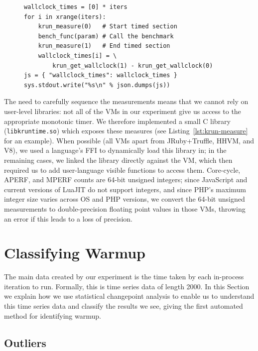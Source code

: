 \documentclass[acmlarge]{acmart}\settopmatter{printfolios=true}
\newcommand{\numiterations}{2000\xspace}
\begin{document}
\begin{figure}[t]
\begin{lstlisting}[label=lst:pyiter, caption={An elided version of the Python
in-process iteration runner (with core cycles etc. removed).}]
wallclock_times = [0] * iters
for i in xrange(iters):
    krun_measure(0)   # Start timed section
    bench_func(param) # Call the benchmark
    krun_measure(1)   # End timed section
    wallclock_times[i] = \
        krun_get_wallclock(1) - krun_get_wallclock(0)
js = { "wallclock_times": wallclock_times }
sys.stdout.write("%s\n" % json.dumps(js))
\end{lstlisting}
\end{figure}

The need to carefully sequence the measurements means that we cannot rely
on user-level libraries: not all of the VMs in our experiment give us access to
the appropriate monotonic timer. We therefore
implemented a small C library (\texttt{libkruntime.so}) which exposes these
measures (see Listing~\ref{lst:krun-measure} for an example). When possible
(all VMs apart from JRuby+Truffle, HHVM, and V8), we used a language's FFI to dynamically load this library
in; in the remaining cases, we linked the library directly against the VM, which
then required us to add user-language visible functions to access them.
Core-cycle\edd{core-cycle or core cycle? Need to do a sweep}, APERF, and MPERF
counts are 64-bit unsigned integers; since
JavaScript and current versions of LuaJIT do not support
integers, and since PHP's maximum integer size varies across OS and PHP versions, we
convert the 64-bit unsigned measurements to
double-precision floating point values in those VMs, throwing an error if this leads to a
loss of precision.


\section{Classifying Warmup}
\label{sec:stats}

The main data created by our experiment is the time taken by each in-process
iteration to run. Formally, this is time series data of length \numiterations. In
this Section we explain how we use statistical changepoint analysis to enable us to
understand this time series data and classify the results we see, giving the
first automated method for identifying warmup.


\subsection{Outliers}
\end{document}
